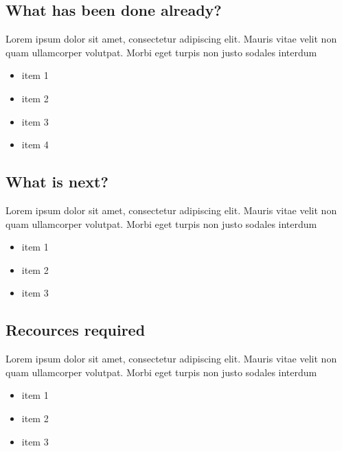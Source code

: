\documentclass[11pt,titlepage]{article}
\begin{document}
\subsection{What has been done already?}
Lorem ipsum dolor sit amet, consectetur adipiscing elit. Mauris vitae velit 
non quam ullamcorper volutpat. Morbi eget turpis non justo sodales interdum
\newline
\begin{itemize}
\item item 1
\item item 2
\item item 3
\item item 4
\end{itemize}

\subsection{What is next?}
Lorem ipsum dolor sit amet, consectetur adipiscing elit. Mauris vitae velit 
non quam ullamcorper volutpat. Morbi eget turpis non justo sodales interdum
\newline
\begin{itemize}
\item item 1
\item item 2
\item item 3
\end{itemize}
 
\subsection{Recources required}
Lorem ipsum dolor sit amet, consectetur adipiscing elit. Mauris vitae velit 
non quam ullamcorper volutpat. Morbi eget turpis non justo sodales interdum
\newline
\begin{itemize}
\item item 1
\item item 2
\item item 3
\end{itemize}
\end{document}
